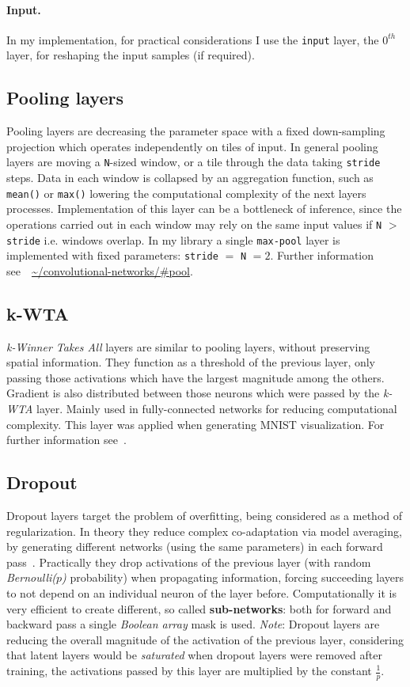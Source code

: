\paragraph{Input.} In my implementation, for practical considerations I use the \texttt{input} layer, the $0^{th}$ layer, for reshaping the input samples (if required).

\subsection{Pooling layers} Pooling layers are decreasing the parameter space with a fixed down-sampling projection which operates independently on tiles of input.
In general pooling layers are moving a \texttt{N}-sized window, or a tile through the data taking \texttt{stride} steps.
Data in each window is collapsed by an aggregation function, such as \texttt{mean()} or \texttt{max()} lowering the computational complexity of the next layers processes. Implementation of this layer can be a bottleneck of inference, since the operations carried out in each window may rely on the same input values if \texttt{N} $>$ \texttt{stride} i.e. windows overlap. In my library a single \texttt{max-pool} layer is implemented with fixed parameters: \texttt{stride} $=$ \texttt{N} $=2$. Further information see~\cite{stanfordlectures}~\url{~/convolutional-networks/#pool}.

\subsection{k-WTA}
\emph{k-Winner Takes All} layers are similar to pooling layers, without preserving spatial information.
They function as a threshold of the previous layer, only passing those activations which have the largest magnitude among the others. 
Gradient is also distributed between those neurons which were passed by the \emph{k-WTA} layer.
Mainly used in fully-connected networks for reducing computational complexity.
This layer was applied when generating MNIST visualization.
For further information see~\cite{wta}.

\subsection{Dropout} Dropout layers target the problem of overfitting, being considered as a method of regularization.
In theory they reduce complex co-adaptation via model averaging, 
by generating different networks (using the same parameters) in each forward pass~\cite{hinton2012improving}.
Practically they drop activations of the previous layer (with random \emph{Bernoulli($p$)} probability) when propagating information, forcing succeeding layers to not depend on an individual neuron of the layer before.  
Computationally it is very efficient to create different, so called \textbf{sub-networks}: both for forward and backward pass a single \emph{Boolean array} mask is used.
\emph{Note}: Dropout layers are reducing the overall magnitude of the activation of the previous layer,
considering that latent layers would be \emph{saturated} when dropout layers were removed after training,
the activations passed by this layer are multiplied by the constant $\frac{1}{p}$.
